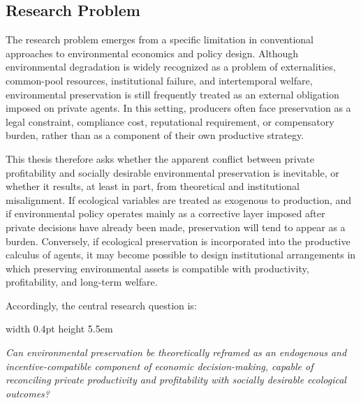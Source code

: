 \subsection{Research Problem}

The research problem emerges from a specific limitation in conventional approaches to environmental economics and policy design. Although environmental degradation is widely recognized as a problem of externalities, common-pool resources, institutional failure, and intertemporal welfare, environmental preservation is still frequently treated as an external obligation imposed on private agents. In this setting, producers often face preservation as a legal constraint, compliance cost, reputational requirement, or compensatory burden, rather than as a component of their own productive strategy.

This thesis therefore asks whether the apparent conflict between private profitability and socially desirable environmental preservation is inevitable, or whether it results, at least in part, from theoretical and institutional misalignment. If ecological variables are treated as exogenous to production, and if environmental policy operates mainly as a corrective layer imposed after private decisions have already been made, preservation will tend to appear as a burden. Conversely, if ecological preservation is incorporated into the productive calculus of agents, it may become possible to design institutional arrangements in which preserving environmental assets is compatible with productivity, profitability, and long-term welfare.

Accordingly, the central research question is:

\vspace{1em}

\begin{flushright}
\begin{minipage}{0.93\linewidth}
\noindent
\hspace{0.4em}\vrule width 0.4pt height 5.5em \hspace{1.2em}%
\parbox[b]{0.95\linewidth}{
\textit{Can environmental preservation be theoretically reframed as an endogenous and incentive-compatible component of economic decision-making, capable of reconciling private productivity and profitability with socially desirable ecological outcomes?}
}
\end{minipage}
\end{flushright}

\vspace{1em}

